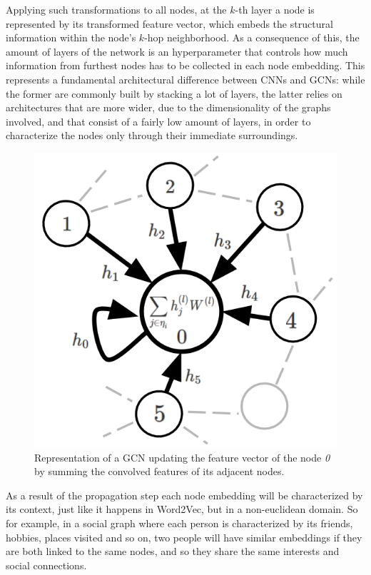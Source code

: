 \documentclass[%
    corpo=13.5pt,
    twoside,
    oldstyle,
    tipotesi=magistrale,
    greek,
    evenboxes
]{toptesi}
\begin{document}
Applying such transformations to all nodes, at the
$k$-th layer a node is represented by its transformed feature vector, which
embeds the structural information within the node's $k$-hop neighborhood.
As a consequence of this, the amount of layers of the network is an
hyperparameter that controls how much information from furthest nodes has to be
collected in each node embedding.
This represents a fundamental architectural difference between CNNs and GCNs:
while the former are commonly built by stacking a lot of layers, the latter
relies on architectures that are more wider, due to the dimensionality of the
graphs involved, and that consist of a fairly low amount of layers, in order to
characterize the nodes only through their immediate surroundings.

\begin{figure}[h]
    \centering
    \includegraphics[scale=0.4]{img/gcn.png}
    \caption{Representation of a GCN updating the feature vector of the node \emph{0}
        by summing the convolved features of its adjacent nodes.}
    \label{fig:gcn}
\end{figure}

As a result of the propagation step each node embedding will be characterized by
its context, just like it happens in Word2Vec, but in a non-euclidean domain.
So for example, in a social graph where each person is characterized by its
friends, hobbies, places visited and so on, two people will have similar
embeddings if they are both linked to the same nodes, and so they share the
same interests and social connections.
\end{document}

